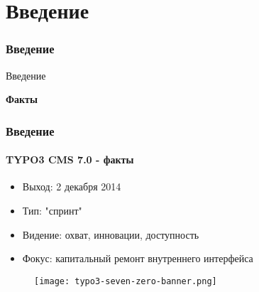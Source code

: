 %

\section{Введение}
\begin{frame}[fragile]
	\frametitle{Введение}

	\begin{center}\huge{Введение}\end{center}
	\begin{center}\huge{\color{typo3darkgrey}\textbf{Факты}}\end{center}

\end{frame}


\begin{frame}[fragile]
	\frametitle{Введение}
	\framesubtitle{TYPO3 CMS 7.0 - факты}

	\begin{itemize}
		\item Выход: 2 декабря 2014
		\item Тип: "спринт"
		\item Видение: охват, инновации, доступность
		\item Фокус: капитальный ремонт внутреннего интерфейса
	\end{itemize}

	\begin{figure}
		\texttt{[image: typo3-seven-zero-banner.png]}
	\end{figure}

\end{frame}

